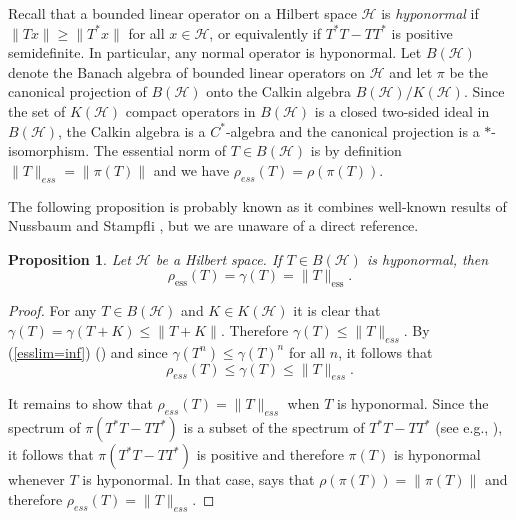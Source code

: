 \documentclass[12pt, reqno]{amsart}
\newtheorem{proposition}[theorem]{Proposition}
\theoremstyle{definition}
\theoremstyle{remark}
\numberwithin{equation}{section}
\begin{document}
 Recall that a bounded linear operator on a Hilbert space $\mathcal{H}$ is \emph{hyponormal} if $\|Tx \| \ge \|T^*x\|$ for all $x \in \mathcal{H}$, or equivalently if $T^*T - TT^*$ is positive semidefinite. In particular, any normal operator is hyponormal.  Let $B(\mathcal{H})$ denote the Banach algebra of bounded linear operators on $\mathcal{H}$  and let $\pi$ be the canonical projection  of $B(\mathcal{H})$ onto the Calkin algebra $B(\mathcal{H})/K(\mathcal{H})$. Since the set of $K(\mathcal{H})$ compact  operators in $B(\mathcal{H})$  is a closed two-sided ideal in $B(\mathcal{H})$, the Calkin algebra is a $C^*$-algebra and the canonical projection is a $*$-isomorphism.  The essential norm of $T \in B(\mathcal{H})$ is by definition $\|T\|_{ess} = \|\pi(T)\|$ and we have  $\rho_{ess}(T) = \rho(\pi(T))$.  
 
 The following proposition is probably known as it combines well-known results of Nussbaum and Stampfli \cite{Nussbaum70, Stampfli62}, but we are unaware of a direct reference.
\begin{proposition} \label{prop:NussbaumStampfli}
Let $\mathcal{H}$ be a Hilbert space. %
If $T \in B(\mathcal{H})$ is hyponormal, then $$\rho_\text{ess}(T) = \gamma(T) = \|T\|_\text{ess}.$$
\end{proposition}
\begin{proof} 
For any $T \in B(\mathcal{H})$ and $K \in K(\mathcal{H})$ %
it is clear that $\gamma(T) = \gamma(T+K) \le \|T+K\|$.  Therefore $\gamma(T) \le \|T\|_{ess}$.  By (\ref{esslim=inf}) (\cite[Theorem 1]{Nussbaum70})
and since $\gamma(T^n) \le \gamma(T)^n$ for all $n$, it follows that
$$\rho_{ess}(T) \le \gamma(T) \le \|T\|_{ess}.$$

It remains to show that $\rho_{ess}(T) = \|T\|_{ess}$ when $T$ is hyponormal.  
Since the spectrum of $\pi(T^*T-TT^*)$ is a subset of the spectrum of $T^*T-TT^*$ (see e.g., \cite[Theorem 2.3]{FillmoreStampfliWilliams72}), it follows that $\pi(T^*T-TT^*)$ is positive and therefore $\pi(T)$ is hyponormal whenever $T$ is hyponormal. In that case, \cite[Theorem 1]{Stampfli62} says that $\rho(\pi(T)) = \|\pi(T)\|$ and therefore $\rho_{ess}(T) = \|T\|_{ess}$. 
\end{proof}
\end{document}
